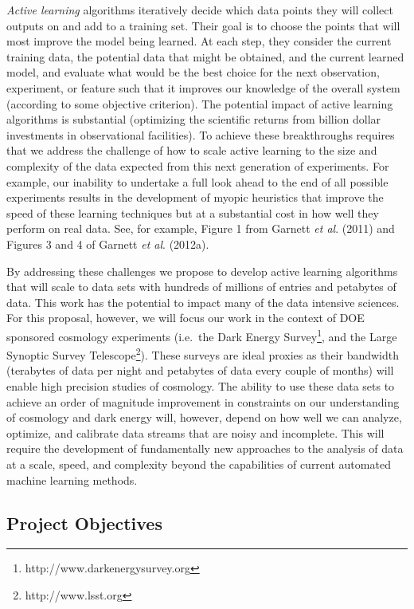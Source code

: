 \documentclass[prd,nofootbib,floatfix,11pt,tightenlines]{revtex4}
\begin{document}
{\it Active learning} algorithms iteratively decide which data
points they will collect outputs on and add to a training set.  Their
goal is to choose the points that will most improve the model being
learned.  At each step, they consider the current training data, the
potential data that might be obtained, and the current learned model,
and evaluate what would be the best choice for the next observation,
experiment, or feature such that it improves our knowledge of the
overall system (according to some objective criterion). The potential
impact of active learning algorithms is substantial (optimizing the
scientific returns from billion dollar investments in observational
facilities). To achieve these breakthroughs requires that we address
the challenge of how to scale active learning to the size and
complexity of the data expected from this next generation of
experiments.  For example, our inability to undertake a full look
ahead to the end of all possible experiments results in the
development of myopic heuristics that improve the speed of these
learning techniques but at a substantial cost in how well they perform
on real data.  See, for example, 
Figure 1 from Garnett {\it et al}. (2011) and Figures
3 and 4 of Garnett {\it et al}. (2012a).

By addressing these challenges we propose to develop active learning
algorithms that will scale to data sets with hundreds of millions of
entries and petabytes of data. This work has the potential to impact
many of the data intensive sciences. For this proposal, however, we
will focus our work in the context of DOE sponsored cosmology
experiments (i.e.\ the Dark Energy
Survey\footnote{http://www.darkenergysurvey.org}, and the Large
Synoptic Survey Telescope\footnote{http://www.lsst.org}). These
surveys are ideal proxies as their bandwidth (terabytes of data per
night and petabytes of data every couple of months) will enable high
precision studies of cosmology. The ability to use these data sets to
achieve an order of magnitude improvement in constraints on our
understanding of cosmology and dark energy will, however, depend on
how well we can analyze, optimize, and calibrate data streams that are
noisy and incomplete. This will require the development of
fundamentally new approaches to the analysis of data at a scale,
speed, and complexity beyond the capabilities of current automated
machine learning methods.

\subsection{Project Objectives}
\label{sec:objectives}
\end{document}
